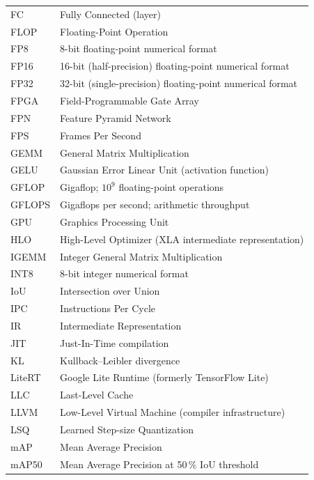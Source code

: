 \documentclass[12pt,a4paper]{report}
\begin{document}
\begin{longtable}{@{}p{3cm}p{10cm}@{}}
FC           & Fully Connected (layer) \\[2pt]
FLOP         & Floating-Point Operation \\[2pt]
FP8          & 8-bit floating-point numerical format \\[2pt]
FP16         & 16-bit (half-precision) floating-point numerical format \\[2pt]
FP32         & 32-bit (single-precision) floating-point numerical format \\[2pt]
FPGA         & Field-Programmable Gate Array \\[2pt]
FPN          & Feature Pyramid Network \\[2pt]
FPS          & Frames Per Second \\[2pt]
GEMM         & General Matrix Multiplication \\[2pt]
GELU         & Gaussian Error Linear Unit (activation function) \\[2pt]
GFLOP        & Gigaflop; $10^{9}$ floating-point operations \\[2pt]
GFLOPS       & Gigaflops per second; arithmetic throughput \\[2pt]
GPU          & Graphics Processing Unit \\[2pt]
HLO          & High-Level Optimizer (XLA intermediate representation) \\[2pt]
IGEMM        & Integer General Matrix Multiplication \\[2pt]
INT8         & 8-bit integer numerical format \\[2pt]
IoU          & Intersection over Union \\[2pt]
IPC          & Instructions Per Cycle \\[2pt]
IR           & Intermediate Representation \\[2pt]
JIT          & Just-In-Time compilation \\[2pt]
KL           & Kullback–Leibler divergence \\[2pt]
LiteRT       & Google Lite Runtime (formerly TensorFlow Lite) \\[2pt]
LLC          & Last-Level Cache \\[2pt]
LLVM         & Low-Level Virtual Machine (compiler infrastructure) \\[2pt]
LSQ          & Learned Step-size Quantization \\[2pt]
mAP          & Mean Average Precision \\[2pt]
mAP50        & Mean Average Precision at 50\,\% IoU threshold \\[2pt]

\end{longtable}
\end{document}
